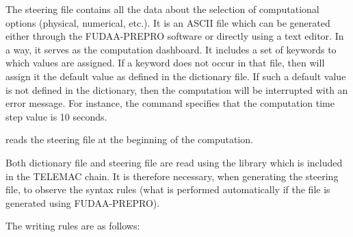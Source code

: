 The steering file contains all the data about the selection of computational
options (physical, numerical, etc.). It is an ASCII file which can be generated
either through the FUDAA-PREPRO software or directly using a text
editor. In a way, it serves as the computation dashboard. It includes a set of
keywords to which values are assigned. If a keyword does not occur in that
file, then  will assign it the default value as defined in the
dictionary file. If such a default value is not defined in the dictionary, then
the computation will be interrupted with an error message. For instance, the
command  specifies that the computation time step
value is 10 seconds.

 reads the steering file at the beginning of the computation.

Both dictionary file and steering file are read using the 
library which is included in the TELEMAC chain. It is therefore necessary,
when generating the steering file, to observe the  syntax
rules (what is performed automatically if the file is generated using
FUDAA-PREPRO).

The writing rules are as follows:

